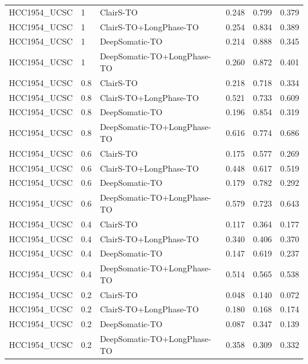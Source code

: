 \documentclass[pdflatex,sn-nature]{sn-jnl}
\begin{document}
{\begin{longtable}{@{}lllccc@{}}
  HCC1954\_UCSC & 1 & ClairS-TO & 0.248 & 0.799 & 0.379 \\
  HCC1954\_UCSC & 1 & ClairS-TO+LongPhase-TO & 0.254 & 0.834 & 0.389 \\
  HCC1954\_UCSC & 1 & DeepSomatic-TO & 0.214 & 0.888 & 0.345 \\
  HCC1954\_UCSC & 1 & DeepSomatic-TO+LongPhase-TO & 0.260 & 0.872 & 0.401 \\
  HCC1954\_UCSC & 0.8 & ClairS-TO & 0.218 & 0.718 & 0.334 \\
  HCC1954\_UCSC & 0.8 & ClairS-TO+LongPhase-TO & 0.521 & 0.733 & 0.609 \\
  HCC1954\_UCSC & 0.8 & DeepSomatic-TO & 0.196 & 0.854 & 0.319 \\
  HCC1954\_UCSC & 0.8 & DeepSomatic-TO+LongPhase-TO & 0.616 & 0.774 & 0.686 \\
  HCC1954\_UCSC & 0.6 & ClairS-TO & 0.175 & 0.577 & 0.269 \\
  HCC1954\_UCSC & 0.6 & ClairS-TO+LongPhase-TO & 0.448 & 0.617 & 0.519 \\
  HCC1954\_UCSC & 0.6 & DeepSomatic-TO & 0.179 & 0.782 & 0.292 \\
  HCC1954\_UCSC & 0.6 & DeepSomatic-TO+LongPhase-TO & 0.579 & 0.723 & 0.643 \\
  HCC1954\_UCSC & 0.4 & ClairS-TO & 0.117 & 0.364 & 0.177 \\
  HCC1954\_UCSC & 0.4 & ClairS-TO+LongPhase-TO & 0.340 & 0.406 & 0.370 \\
  HCC1954\_UCSC & 0.4 & DeepSomatic-TO & 0.147 & 0.619 & 0.237 \\
  HCC1954\_UCSC & 0.4 & DeepSomatic-TO+LongPhase-TO & 0.514 & 0.565 & 0.538 \\
  HCC1954\_UCSC & 0.2 & ClairS-TO & 0.048 & 0.140 & 0.072 \\
  HCC1954\_UCSC & 0.2 & ClairS-TO+LongPhase-TO & 0.180 & 0.168 & 0.174 \\
  HCC1954\_UCSC & 0.2 & DeepSomatic-TO & 0.087 & 0.347 & 0.139 \\
  HCC1954\_UCSC & 0.2 & DeepSomatic-TO+LongPhase-TO & 0.358 & 0.309 & 0.332 \\
\end{longtable}
}
\end{document}

